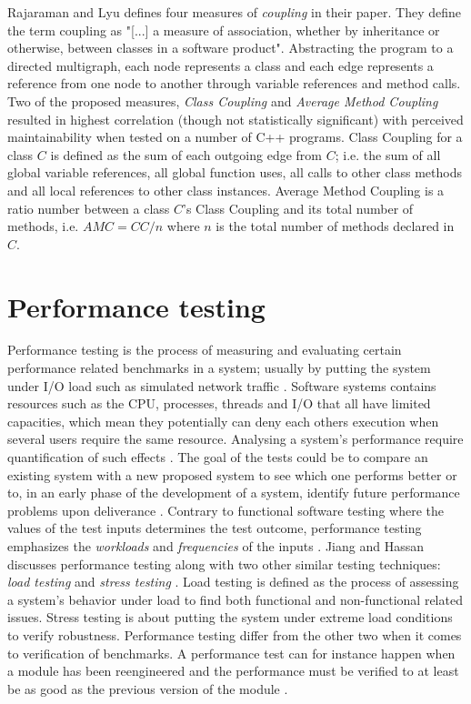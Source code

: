 Rajaraman and Lyu \cite{rajaraman1992reliability} defines four measures of
\textit{coupling} in their paper. They define the term coupling as "[...] a
measure of association, whether by inheritance or otherwise, between classes in
a software product". Abstracting the program to a directed multigraph, each
node represents a class and each edge represents a reference from one node to
another through variable references and method calls. Two of the proposed
measures, \textit{Class Coupling} and \textit{Average Method Coupling} resulted
in highest correlation (though not statistically significant) with perceived
maintainability when tested on a number of C++ programs. Class Coupling for a
class $C$ is defined as the sum of each outgoing edge from $C$; i.e. the sum of
all global variable references, all global function uses, all calls to other
class methods and all local references to other class instances. Average Method
Coupling is a ratio number between a class $C$'s Class Coupling and its total
number of methods, i.e. $AMC = CC / n$ where $n$ is the total number of methods
declared in $C$.

\section{Performance testing}

Performance testing is the process of measuring and evaluating certain
performance related benchmarks in a system; usually by putting the system under
I/O load such as simulated network traffic \cite{jiang2015survey}. Software
systems contains resources such as the CPU, processes, threads and I/O that all
have limited capacities, which mean they potentially can deny each others
execution when several users require the same resource. Analysing a system's
performance require quantification of such effects \cite{woodside2007future}.
The goal of the tests could be to compare an existing system with a new
proposed system to see which one performs better \cite{avritzer1996deriving} or
to, in an early phase of the development of a system, identify future
performance problems upon deliverance \cite{weyuker2000experience}. Contrary to
functional software testing where the values of the test inputs determines the
test outcome, performance testing emphasizes the \textit{workloads} and
\textit{frequencies} of the inputs \cite{weyuker2000experience}. Jiang and
Hassan discusses performance testing along with two other similar testing
techniques: \textit{load testing} and \textit{stress testing}
\cite{jiang2015survey}. Load testing is defined as the process of assessing a
system's behavior under load to find both functional and non-functional related
issues. Stress testing is about putting the system under extreme load
conditions to verify robustness.  Performance testing differ from the other two
when it comes to verification of benchmarks. A performance test can for
instance happen when a module has been reengineered and the performance must be
verified to at least be as good as the previous version of the module
\cite{jiang2015survey}.

